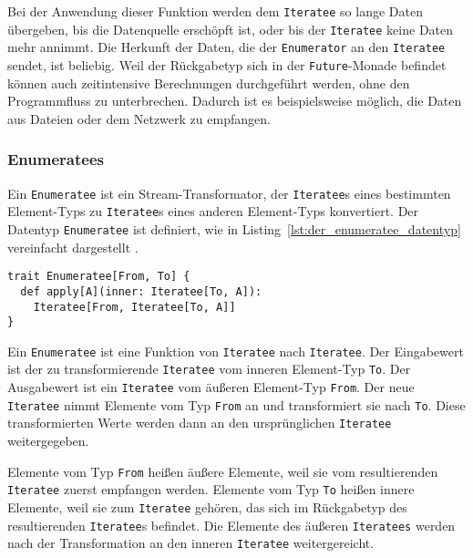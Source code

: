 \documentclass[draft=false
              ,paper=a4
              ,twoside=false
              ,fontsize=11pt
              ,headsepline
              ,BCOR10mm
              ,DIV11
              ]{scrbook}
\begin{document}
Bei der Anwendung dieser Funktion werden dem \lstinline|Iteratee| so lange Daten übergeben, bis die Datenquelle erschöpft ist, oder bis der \lstinline|Iteratee| keine Daten mehr annimmt.
Die Herkunft der Daten, die der \lstinline|Enumerator| an den \lstinline|Iteratee| sendet, ist beliebig.
Weil der Rückgabetyp sich in der \lstinline|Future|-Monade befindet können auch zeitintensive Berechnungen durchgeführt werden, ohne den Programmfluss zu unterbrechen.
Dadurch ist es beispielsweise möglich, die Daten aus Dateien oder dem Netzwerk zu empfangen.



\subsubsection{Enumeratees} %
\label{ssub:design_enumeratees}

Ein \lstinline|Enumeratee| ist ein Stream-Transformator, der \lstinline|Iteratee|s eines bestimmten Element-Typs zu \lstinline|Iteratee|s eines anderen Element-Typs konvertiert.
Der Datentyp \lstinline|Enumeratee| ist definiert, wie in Listing~\ref{lst:der_enumeratee_datentyp} vereinfacht dargestellt \cite[vgl.][]{play_enumeratee_source_code}.
\begin{lstlisting}[caption=Der Enumeratee-Datentyp, label=lst:der_enumeratee_datentyp]
trait Enumeratee[From, To] {
  def apply[A](inner: Iteratee[To, A]):
    Iteratee[From, Iteratee[To, A]]
}
\end{lstlisting}

Ein \lstinline|Enumeratee| ist eine Funktion von \lstinline|Iteratee| nach \lstinline|Iteratee|.
Der Eingabewert ist der zu transformierende \lstinline|Iteratee| vom inneren Element-Typ \lstinline|To|.
Der Ausgabewert ist ein \lstinline|Iteratee| vom äußeren Element-Typ \lstinline|From|.
Der neue \lstinline|Iteratee| nimmt Elemente vom Typ \lstinline|From| an und transformiert sie nach \lstinline|To|.
Diese transformierten Werte werden dann an den ursprünglichen \lstinline|Iteratee| weitergegeben.

Elemente vom Typ \lstinline|From| heißen äußere Elemente, weil sie vom resultierenden \lstinline|Iteratee| zuerst empfangen werden.
Elemente vom Typ \lstinline|To| heißen innere Elemente, weil sie zum \lstinline|Iteratee| gehören, das sich im Rückgabetyp des resultierenden \lstinline|Iteratee|s befindet.
Die Elemente des äußeren \lstinline|Iteratees| werden nach der Transformation an den inneren \lstinline|Iteratee| weitergereicht.
\end{document}
